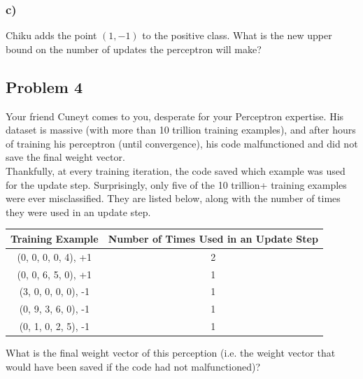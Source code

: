 \documentclass[a4paper]{article}
\begin{document}
\subsubsection*{c)}
Chiku adds the point $(1,-1)$ to the positive class. What is the new upper bound on the number of updates the perceptron will make?

\subsection*{Problem 4}
Your friend Cuneyt comes to you, desperate for your Perceptron expertise. His dataset is massive (with more than 10 trillion training examples), and after hours of training his perceptron (until convergence), his code malfunctioned and did not save the final weight vector.\\

Thankfully, at every training iteration, the code saved which example was used for the update step. Surprisingly, only five of the 10 trillion+ training examples were ever misclassified. They are listed below, along with the number of times they were used in an update step.

\begin{center}
\begin{tabular}{ c c }
 Training Example & Number of Times Used in an Update Step \\ 
 \hline
 (0, 0, 0, 0, 4),	+1 & 2  \\
 (0, 0, 6, 5, 0),	+1 & 1  \\
 (3, 0, 0, 0, 0),	-1 & 1  \\
 (0, 9, 3, 6, 0),	-1 & 1  \\ 
 (0, 1, 0, 2, 5),	-1 & 1     
\end{tabular}
\end{center}

What is the final weight vector of this perception (i.e. the weight vector that would have been saved if the code had not malfunctioned)?
\end{document}
